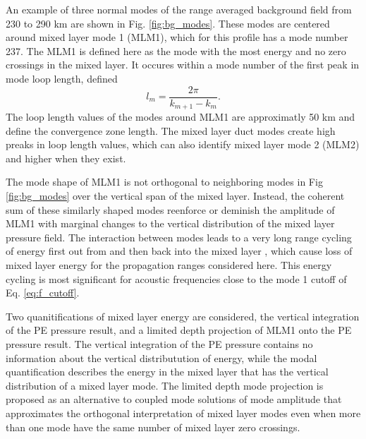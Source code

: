 \documentclass[preprint,NumberedRefs]{JASA}
\begin{document}
An example of three normal modes of the range averaged background field from 230 to 290 km are shown in Fig. \ref{fig:bg_modes}. These modes are centered around mixed layer mode 1 (MLM1), which for this profile has a mode number 237. The MLM1 is defined here as the mode with the most energy and no zero crossings in the mixed layer. It occures within a mode number of the first peak in mode loop length\citep{jensen2011computational}, defined
\begin{equation}
    l_{m} = \frac{2 \pi}{k_{m+1} - k_m}.
    \label{eq:loop_length}
\end{equation}
The loop length values of the modes around MLM1 are approximatly 50 km and define the convergence zone length. The mixed layer duct modes create high preaks in loop length values, which can also identify mixed layer mode 2 (MLM2) and higher when they exist.

The mode shape of MLM1 is not orthogonal to neighboring modes in Fig \ref{fig:bg_modes} over the vertical span of the mixed layer. Instead, the coherent sum of these similarly shaped modes reenforce or deminish the amplitude of MLM1 with marginal changes to the vertical distribution of the mixed layer pressure field. The interaction between modes leads to a very long range cycling of energy first out from and then back into the mixed layer \citep{porter93}, which cause loss of mixed layer energy for the propagation ranges considered here. This energy cycling is most significant for acoustic frequencies close to the mode 1 cutoff of Eq. \eqref{eq:f_cutoff}.

Two quanitifications of mixed layer energy are considered, the vertical integration of the PE pressure result, and a limited depth projection of MLM1 onto the PE pressure result. The vertical integration of the PE pressure contains no information about the vertical distributution of energy, while the modal quantification describes the energy in the mixed layer that has the vertical distribution of a mixed layer mode. The limited depth mode projection is proposed as an alternative to coupled mode solutions of mode amplitude that approximates the orthogonal interpretation of mixed layer modes even when more than one mode have the same number of mixed layer zero crossings.
\end{document}
